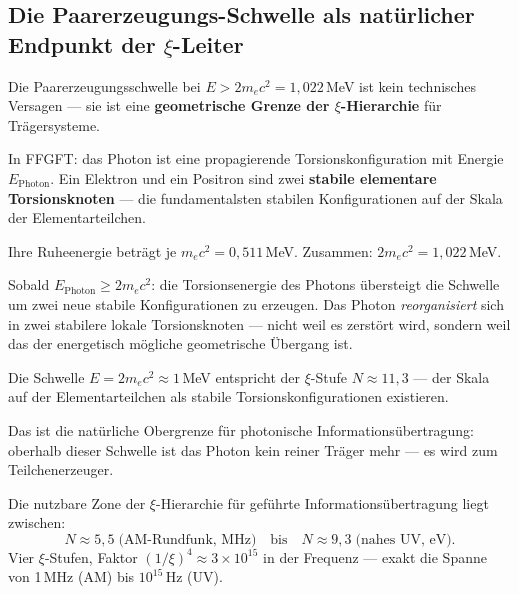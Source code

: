 \subsection{Die Paarerzeugungs-Schwelle als natürlicher
  Endpunkt der \texorpdfstring{$\xi$}{xi}-Leiter}
\label{sec:paarerschoepfung}

Die Paarerzeugungsschwelle bei $E > 2 m_e c^2 = 1{,}022$\,MeV
ist kein technisches Versagen ---
sie ist eine \textbf{geometrische Grenze der $\xi$-Hierarchie}
für Trägersysteme.

In FFGFT: das Photon ist eine propagierende
Torsionskonfiguration mit Energie $E_\text{Photon}$.
Ein Elektron und ein Positron sind zwei
\textbf{stabile elementare Torsionsknoten} ---
die fundamentalsten stabilen Konfigurationen
auf der Skala der Elementarteilchen.

Ihre Ruheenergie beträgt je $m_e c^2 = 0{,}511$\,MeV.
Zusammen: $2 m_e c^2 = 1{,}022$\,MeV.

Sobald $E_\text{Photon} \geq 2 m_e c^2$:
die Torsionsenergie des Photons übersteigt
die Schwelle um zwei neue stabile Konfigurationen
zu erzeugen.
Das Photon \emph{reorganisiert} sich in
zwei stabilere lokale Torsionsknoten ---
nicht weil es zerstört wird,
sondern weil das der energetisch mögliche
geometrische Übergang ist.

\begin{keyresult}
Die Schwelle $E = 2 m_e c^2 \approx 1$\,MeV
entspricht der $\xi$-Stufe $N \approx 11{,}3$ ---
der Skala auf der Elementarteilchen als stabile
Torsionskonfigurationen existieren.

Das ist die natürliche Obergrenze für photonische
Informationsübertragung:
oberhalb dieser Schwelle ist das Photon kein
reiner Träger mehr --- es wird zum
Teilchenerzeuger.

Die nutzbare Zone der $\xi$-Hierarchie für
geführte Informationsübertragung liegt zwischen:
\begin{equation}
  N \approx 5{,}5 \;\text{(AM-Rundfunk, MHz)}
  \quad\text{bis}\quad
  N \approx 9{,}3 \;\text{(nahes UV, eV)}.
\end{equation}
Vier $\xi$-Stufen, Faktor $(1/\xi)^4 \approx 3 \times 10^{15}$
in der Frequenz --- exakt die Spanne von
1\,MHz (AM) bis $10^{15}$\,Hz (UV).
\end{keyresult}

